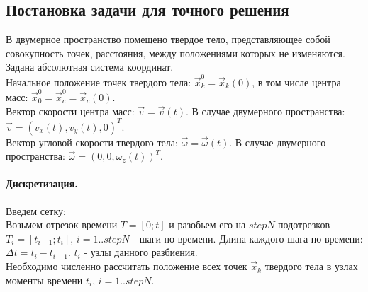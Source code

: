 \documentclass[12pt,a4paper]{article}
\begin{document}
\subsection{Постановка задачи для точного решения}
В двумерное пространство помещено твердое тело, представляющее собой совокупность точек, расстояния, между положениями которых не изменяются. Задана абсолютная система координат.\\
Начальное положение точек твердого тела: $\overrightarrow{x}_k^0 = \overrightarrow{x}_k(0)$, в том числе центра масс:  $\overrightarrow{x}_0^0 = \overrightarrow{x}_c^0 = \overrightarrow{x}_c(0)$.\\
Вектор скорости центра масс: $\overrightarrow{v}=\overrightarrow{v}(t)$. В случае двумерного пространства: $\overrightarrow{v}=(v_x(t), v_y(t), 0)^T$.\\
Вектор угловой скорости твердого тела: $\overrightarrow{\omega}=\overrightarrow{\omega}(t)$. В случае двумерного пространства: $\overrightarrow{\omega}=(0, 0, \omega_z(t))^T$.\\

\paragraph{Дискретизация.}
Введем сетку:\\
Возьмем отрезок времени $T=[0;t]$ и разобьем его на $stepN$ подотрезков $T_i=[t_{i-1}; t_i]$, $i=1..stepN$ - шаги по времени. Длина каждого шага по времени: $\Delta t= t_i-t_{i-1}$. $t_i$ - узлы данного разбиения.\\
Необходимо численно рассчитать положение всех точек $\overrightarrow{x}_k$ твердого тела в узлах  моменты времени $t_i$, $i=1..stepN$.
\end{document}
